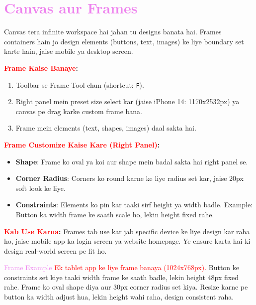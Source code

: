 \documentclass[a4paper]{article}
\begin{document}
\section*{\textbf{\LARGE \textcolor{violet}{Canvas aur Frames}}}
\textcolor{warningred}{Canvas tera infinite workspace hai jahan tu designs banata hai.} Frames containers hain jo design elements (buttons, text, images) ke liye boundary set karte hain, jaise mobile ya desktop screen.

\textbf{\textcolor{red}{Frame Kaise Banaye}:}
\begin{enumerate}
  \item \textcolor{examplegreen}{Toolbar se Frame Tool chun (shortcut: \texttt{F}).}
  \item \textcolor{examplegreen}{Right panel mein preset size select kar (jaise iPhone 14: 1170x2532px) ya canvas pe drag karke custom frame bana.}
  \item Frame mein elements (text, shapes, images) daal sakta hai.
\end{enumerate}

\textbf{\textcolor{red}{Frame Customize Kaise Kare (Right Panel)}:}
\begin{itemize}
  \item \textbf{\textcolor{warningred}{Shape}}: \textcolor{examplegreen}{Frame ko oval ya koi aur shape mein badal sakta hai right panel se.}
  \item \textbf{\textcolor{warningred}{Corner Radius}}: \textcolor{examplegreen}{Corners ko round karne ke liye radius set kar, jaise 20px soft look ke liye.}
  \item \textbf{\textcolor{warningred}{Constraints}}: \textcolor{examplegreen}{Elements ko pin kar taaki sirf height ya width badle. Example: Button ka width frame ke saath scale ho, lekin height fixed rahe.}
\end{itemize}

\textbf{\textcolor{red}{Kab Use Karna}:}
\textcolor{examplegreen}{Frames tab use kar jab specific device ke liye design kar raha ho, jaise mobile app ka login screen ya website homepage.} Ye ensure karta hai ki design real-world screen pe fit ho.

\begin{examplebox}{\textcolor{violet}{Frame Example}}
\textcolor{red}{Ek tablet app ke liye frame banaya (1024x768px).} Button ke constraints set kiye taaki width frame ke saath badle, lekin height 48px fixed rahe. \textcolor{examplegreen}{Frame ko oval shape diya aur 30px corner radius set kiya.} Resize karne pe button ka width adjust hua, lekin height wahi raha, design consistent raha.
\end{examplebox}
\end{document}
